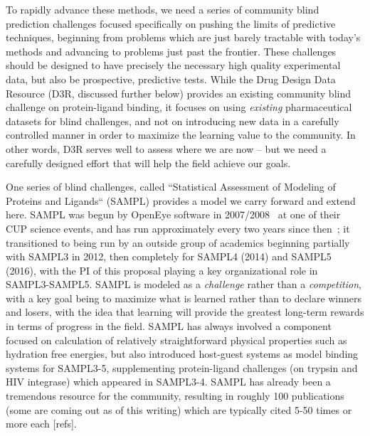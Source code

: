 \documentclass[11pt]{article}
\begin{document}
To rapidly advance these methods, we need a series of community blind prediction challenges focused specifically on pushing the limits of predictive techniques, beginning from problems which are just barely tractable with today's methods and advancing to problems just past the frontier.
These challenges should be designed to have precisely the necessary high quality experimental data, but also be prospective, predictive tests.
While the Drug Design Data Resource (D3R, discussed further below) provides an existing community blind challenge on protein-ligand binding, it focuses on using \emph{existing} pharmaceutical datasets for blind challenges, and not on introducing new data in a carefully controlled manner in order to maximize the learning value to the community. 
In other words, D3R serves well to assess where we are now -- but we need a carefully designed effort that will help the field achieve our goals.

One series of blind challenges, called ``Statistical Assessment of Modeling of Proteins and Ligands`` (SAMPL) provides a model we carry forward and extend here. 
SAMPL was begun by OpenEye software in 2007/2008~\cite{nicholls_predicting_2008} at one of their CUP science events, and has run approximately every two years since then~\cite{nicholls_samp1_2009, mobley_predictions_2009, geballe_sampl2_2010, geballe_sampl3_2012, mobley_blind_2014-1, muddana_sampl4_2014, bannan_blind_2016, yin_sampl5_preprint}; it transitioned to being run by an outside group of academics beginning partially with SAMPL3 in 2012, then completely for SAMPL4 (2014) and SAMPL5 (2016), with the PI of this proposal playing a key organizational role in SAMPL3-SAMPL5.
SAMPL is modeled as a \emph{challenge} rather than a \emph{competition}, with a key goal being to maximize what is learned rather than to declare winners and losers, with the idea that learning will provide the greatest long-term rewards in terms of progress in the field.
SAMPL has always involved a component focused on calculation of relatively straightforward physical properties such as hydration free energies, but also introduced host-guest systems as model binding systems for SAMPL3-5, supplementing protein-ligand challenges (on trypsin and HIV integrase) which appeared in SAMPL3-4. 
SAMPL has already been a tremendous resource for the community, resulting in roughly 100 publications (some are coming out as of this writing) which are typically cited 5-50 times or more each [refs].
\end{document}

